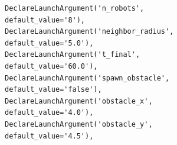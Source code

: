 \begin{figure}[t]
\centering
\begin{lstlisting}[style=python,
    caption={Argumentos de consenso\_prom.launch.py.},
    label={lst:consenso_args}]
DeclareLaunchArgument('n_robots',         default_value='8'),
DeclareLaunchArgument('neighbor_radius',  default_value='5.0'),
DeclareLaunchArgument('t_final',          default_value='60.0'),
DeclareLaunchArgument('spawn_obstacle',   default_value='false'),
DeclareLaunchArgument('obstacle_x',       default_value='4.0'),
DeclareLaunchArgument('obstacle_y',       default_value='4.5'),
\end{lstlisting}
\end{figure}
